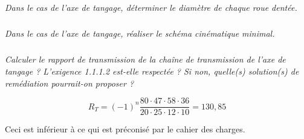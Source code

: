 \documentclass[10pt,fleqn]{article} %
\begin{document}
\begin{multicols}{2}
\else
\subparagraph{}
\textit{Dans le cas de l'axe de tangage, déterminer le diamètre de chaque roue dentée.}
%
%
%
\subparagraph{}
\textit{Dans le cas de l'axe de tangage, réaliser le schéma cinématique minimal.}
\ifprof
\begin{corrige}
\end{corrige}
\else
\fi

\subparagraph{}
\textit{Calculer le rapport de transmission de la chaîne de transmission de l'axe de tangage ? L'exigence 1.1.1.2 est-elle respectée ? Si non, quelle(s) solution(s) de remédiation pourrait-on proposer ?}
\ifprof
\begin{corrige}
$$
R_T = (-1)^n \dfrac{80\cdot 47 \cdot 58 \cdot 36}{20\cdot 25\cdot 12 \cdot 10 } = 130,85
$$

Ceci est inférieur à ce qui est préconisé par le cahier des charges. 


\end{corrige}
\end{multicols}
\end{document}
